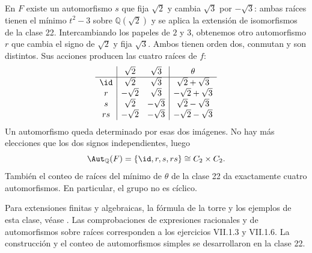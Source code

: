 En $F$ existe un automorfismo $s$ que fija $\sqrt2$ y cambia $\sqrt3$ por $-\sqrt3$: ambas raíces tienen el mínimo $t^2-3$ sobre $\mathbb Q(\sqrt2)$ y se aplica la extensión de isomorfismos de la clase 22. Intercambiando los papeles de $2$ y $3$, obtenemos otro automorfismo $r$ que cambia el signo de $\sqrt2$ y fija $\sqrt3$. Ambos tienen orden dos, conmutan y son distintos. Sus acciones producen las cuatro raíces de $f$:
\[
\begin{array}{c|cc|c}
&\sqrt2&\sqrt3&\theta\\\hline
\id&\sqrt2&\sqrt3&\sqrt2+\sqrt3\\
r&-\sqrt2&\sqrt3&-\sqrt2+\sqrt3\\
s&\sqrt2&-\sqrt3&\sqrt2-\sqrt3\\
rs&-\sqrt2&-\sqrt3&-\sqrt2-\sqrt3
\end{array}
\]
Un automorfismo queda determinado por esas dos imágenes. No hay más elecciones que los dos signos independientes, luego
\[
\Aut_{\mathbb Q}(F)=\{\id,r,s,rs\}\cong C_2\times C_2.
\]
También el conteo de raíces del mínimo de $\theta$ de la clase 22 da exactamente cuatro automorfismos. En particular, el grupo no es cíclico.

\begin{obs}
Para extensiones finitas y algebraicas, la fórmula de la torre y los ejemplos de esta clase, véase \citet[cap.~VII, apartado 1.3, definición 1.8, lema 1.9 y resultados 1.10--19]{aluffi2009}. Las comprobaciones de expresiones racionales y de automorfismos sobre raíces corresponden a los ejercicios VII.1.3 y VII.1.6. La construcción y el conteo de automorfismos simples se desarrollaron en la clase 22.
\end{obs}

